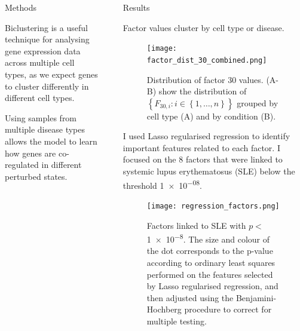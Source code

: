 \documentclass[final]{beamer}
\newlength{\sepwid}
\newlength{\onecolwid}
\begin{document}
\begin{frame}[t]
\begin{columns}[t]
\begin{column}{\onecolwid}
\begin{block}{Methods}
\begin{alertblock}{}
Biclustering is a useful technique for analysing gene expression data across multiple cell types, as we expect genes to cluster differently in different cell types.
\end{alertblock}

Using samples from multiple disease types allows the model to learn how genes are co-regulated in different perturbed states.

\end{block}




\end{column} %

\begin{column}{\sepwid}\end{column} %

\begin{column}{\onecolwid} %


\begin{block}{Results}

Factor values cluster by cell type or disease.

\begin{figure}[h]
\centering
\texttt{[image: factor\_dist\_30\_combined.png]}
\caption{Distribution of factor 30 values. (A-B) show the distribution of $\left\lbrace F_{30,i} : i \in \left\lbrace 1 , \dots, n \right\rbrace \right\rbrace
$ grouped by cell type (A) and by condition (B).}
\label{fig:dist_30}
\end{figure}

I used Lasso regularised regression to identify important features related to each factor. I focused on the 8 factors that were linked to systemic lupus erythematosus (SLE) below the threshold \num{1e-08}.

\begin{figure}[h]
\centering
\texttt{[image: regression\_factors.png]}
\caption{Factors linked to SLE with $p<$ \num{1e-8}. The size and colour of the dot corresponds to the p-value according to ordinary least squares performed on the features selected by Lasso regularised regression, and then adjusted using the Benjamini-Hochberg procedure to correct for multiple testing.}
\label{fig:regression_factors_SLE}
\end{figure}


\end{block}
\end{column}
\end{columns}
\end{frame}
\end{document}
